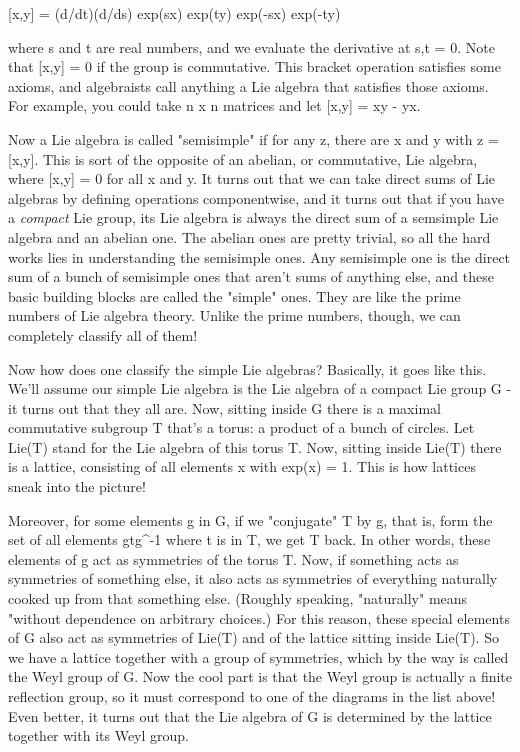 [x,y] = (d/dt)(d/ds) exp(sx) exp(ty) exp(-sx) exp(-ty) 

where s and t are real numbers, and we evaluate the derivative at s,t
= 0.  Note that [x,y] = 0 if the group is commutative.  This bracket
operation satisfies some axioms, and algebraists call anything a Lie
algebra that satisfies those axioms.  For example, you could take n x
n matrices and let [x,y] = xy - yx.

Now a Lie algebra is called "semisimple" if for any z, there
are x and y with z = [x,y].  This is sort of the opposite of an
abelian, or commutative, Lie algebra, where [x,y] = 0 for all x and y.
It turns out that we can take direct sums of Lie algebras by defining
operations componentwise, and it turns out that if you have a
\emph{compact} Lie group, its Lie algebra is always the direct sum
of a semsimple Lie algebra and an abelian one.  The abelian ones are
pretty trivial, so all the hard works lies in understanding the
semisimple ones.  Any semisimple one is the direct sum of a bunch of
semisimple ones that aren't sums of anything else, and these basic
building blocks are called the "simple" ones.  They are like
the prime numbers of Lie algebra theory.  Unlike the prime numbers,
though, we can completely classify all of them!

Now how does one classify the simple Lie algebras?  Basically, it goes
like this.  We'll assume our simple Lie algebra is the Lie algebra of a
compact Lie group G - it turns out that they all are.  Now, sitting
inside G there is a maximal commutative subgroup T that's a torus: a
product of a bunch of circles.  Let Lie(T) stand for the Lie algebra of
this torus T.  Now, sitting inside Lie(T) there is a lattice, consisting
of all elements x with exp(x) = 1.  This is how lattices sneak into the
picture!

Moreover, for some elements g in G, if we "conjugate" T by
g, that is, form the set of all elements gtg^{-1} where t is
in T, we get T back.  In other words, these elements of g act as
symmetries of the torus T.  Now, if something acts as symmetries of
something else, it also acts as symmetries of everything naturally
cooked up from that something else.  (Roughly speaking,
"naturally" means "without dependence on arbitrary
choices.)  For this reason, these special elements of G also act as
symmetries of Lie(T) and of the lattice sitting inside Lie(T).  So we
have a lattice together with a group of symmetries, which by the way
is called the Weyl group of G.  Now the cool part is that the Weyl
group is actually a finite reflection group, so it must correspond to
one of the diagrams in the list above!  Even better, it turns out that
the Lie algebra of G is determined by the lattice together with its
Weyl group.

